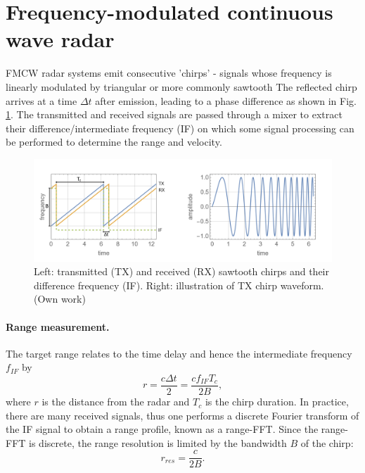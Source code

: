 \documentclass{article}
\begin{document}
\section{Frequency-modulated continuous wave radar}
FMCW radar systems emit consecutive 'chirps' - signals whose frequency is linearly modulated by triangular or more commonly sawtooth The reflected chirp arrives at a time \(\Delta t\) after emission, leading to a phase difference as shown in Fig. \ref{fig:Chirp}. The transmitted and received signals are passed through a mixer to extract their difference/intermediate frequency (IF) on which some signal processing can be performed to determine the range and velocity.

\begin{figure}[h!]
	\centering
	\includegraphics[width=\textwidth]{chirp-3}
	\caption{Left: transmitted (TX) and received (RX) sawtooth chirps and their difference frequency (IF). Right: illustration of TX chirp waveform. (Own work)}
	\label{fig:Chirp}
\end{figure}

\paragraph{Range measurement.} The target range relates to the time delay and hence the intermediate frequency \(f_{IF}\) by
\begin{equation}
	r = \frac{c \Delta t}{2} = \frac{c f_{IF} T_c}{2 B},
\end{equation}
where \(r\) is the distance from the radar and \(T_c\) is the chirp duration.\supercite{TIFMCWDoppler}
In practice, there are many received signals, thus one performs a discrete Fourier transform of the IF signal to obtain a range profile, known as a range-FFT. Since the range-FFT is discrete, the range resolution is limited by the bandwidth \(B\) of the chirp:
\begin{equation}
	r_{res} = \frac{c}{2B}.
\end{equation}
\end{document}
